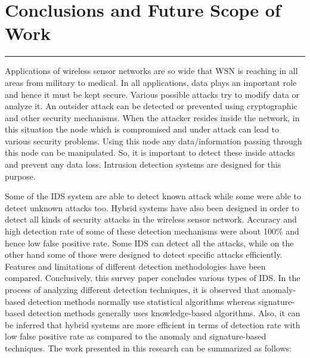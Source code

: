 \chapter{Conclusions and Future Scope of Work}
\label{C7} %
\noindent\rule{\linewidth}{2pt}
Applications of wireless sensor networks are so wide that WSN is reaching in all areas from military to medical. In all applications, data plays an important role and hence it must be kept secure. Various possible attacks try to modify data or analyze it. An outsider attack can be detected or prevented using cryptographic and other security mechanisms. When the attacker resides inside the network, in this situation the node which is compromised and under attack can lead to various security problems. Using this node any data/information passing through this node can be manipulated. So, it is important to detect these inside attacks and prevent any data loss. Intrusion detection systems are designed for this purpose.
\par Some of the IDS system are able to detect known attack while some were able to detect unknown attacks too. Hybrid systems have also been designed in order to detect all kinds of security attacks in the wireless sensor network. Accuracy and high detection rate of some of these detection mechanisms were about 100\% and hence low false positive rate. Some IDS can detect all the attacks, while on the other hand some of those were designed to detect specific attacks efficiently. Features and limitations of different detection methodologies have been compared. Conclusively, this survey paper concludes various types of IDS. In the process of analyzing different detection techniques, it is observed that anomaly-based detection methods normally use statistical algorithms whereas signature-based detection methods generally uses knowledge-based algorithms. Also, it can be inferred that hybrid systems are more efficient in terms of detection rate with low false positive rate as compared to the anomaly and signature-based techniques. The work presented in this research can be summarized as follows:
